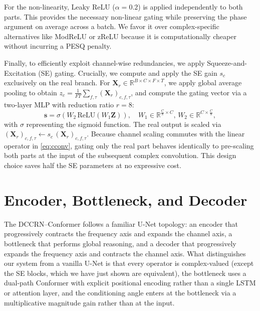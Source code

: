 \documentclass[journal,10pt]{IEEEtran}
\newcommand{\R}{\mathbb{R}}
\newcommand{\bX}{\mathbf{X}}
\newcommand{\bZ}{\mathbf{Z}}
\newcommand{\bs}{\mathbf{s}}
\begin{document}
For the non-linearity, Leaky ReLU (\(\alpha=0.2\)) is applied independently to both parts. This provides the necessary non-linear gating while preserving the phase argument on average across a batch. We favor it over complex-specific alternatives like ModReLU or zReLU because it is computationally cheaper without incurring a PESQ penalty.

Finally, to efficiently exploit channel-wise redundancies, we apply Squeeze-and-Excitation (SE) \cite{hu2018squeeze} gating. Crucially, we compute and apply the SE gain \(s_c\) exclusively on the real branch. For \(\bX_r\in\R^{B\times C\times F\times T}\), we apply global average pooling to obtain \(z_c=\tfrac{1}{FT}\!\sum_{f,\tau}\!(\bX_r)_{c,f,\tau}\), and compute the gating vector via a two-layer MLP with reduction ratio \(r=8\):
\begin{equation}
\bs=\sigma\!\left(W_2\,\mathrm{ReLU}(W_1\bZ)\right),\quad W_1\!\in\!\R^{\frac{C}{8}\times C},\,W_2\!\in\!\R^{C\times\frac{C}{8}},
\label{eq:se}
\end{equation}
with \(\sigma\) representing the sigmoid function. The real output is scaled via \((\bX_r)_{c,f,\tau}\leftarrow s_c\,(\bX_r)_{c,f,\tau}\). Because channel scaling commutes with the linear operator in \eqref{eq:cconv}, gating only the real part behaves identically to pre-scaling both parts at the input of the subsequent complex convolution. This design choice saves half the SE parameters at no expressive cost.

\section{Encoder, Bottleneck, and Decoder}
\label{sec:network}
The DCCRN--Conformer follows a familiar U-Net topology: an encoder that progressively contracts the frequency axis and expands the channel axis, a bottleneck that performs global reasoning, and a decoder that progressively expands the frequency axis and contracts the channel axis. What distinguishes our system from a vanilla U-Net is that every operator is complex-valued (except the SE blocks, which we have just shown are equivalent), the bottleneck uses a dual-path Conformer with explicit positional encoding rather than a single LSTM or attention layer, and the conditioning angle enters at the bottleneck via a multiplicative magnitude gain rather than at the input.
\end{document}
